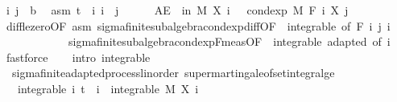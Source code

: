 \begin{isabellebody}
\ i\ j\ {\isacharcolon}{\kern0pt}{\isacharcolon}{\kern0pt}\ {\isacharprime}{\kern0pt}b\ \isamarkupfalse%
\ asm{\isacharcolon}{\kern0pt}\ {\isachardoublequoteopen}t\ {\isasymle}\ i{\isachardoublequoteclose}\ {\isachardoublequoteopen}i\ {\isasymle}\ j{\isachardoublequoteclose}\isanewline
\ \ \ \ \isamarkupfalse%
\ {\isachardoublequoteopen}AE\ {\isasymxi}\ in\ M{\isachardot}{\kern0pt}\ X\ i\ {\isasymxi}\ {\isasymge}\ cond{\isacharunderscore}{\kern0pt}exp\ M\ {\isacharparenleft}{\kern0pt}F\ i{\isacharparenright}{\kern0pt}\ {\isacharparenleft}{\kern0pt}X\ j{\isacharparenright}{\kern0pt}\ {\isasymxi}{\isachardoublequoteclose}\ \isanewline
\ \ \ \ \ \ \isamarkupfalse%
\ diff{\isacharunderscore}{\kern0pt}le{\isacharunderscore}{\kern0pt}zero{\isacharbrackleft}{\kern0pt}OF\ asm{\isacharbrackright}{\kern0pt}\ sigma{\isacharunderscore}{\kern0pt}finite{\isacharunderscore}{\kern0pt}subalgebra{\isachardot}{\kern0pt}cond{\isacharunderscore}{\kern0pt}exp{\isacharunderscore}{\kern0pt}diff{\isacharbrackleft}{\kern0pt}OF\ {\isacharunderscore}{\kern0pt}\ integrable{\isacharparenleft}{\kern0pt}{}{\isacharcomma}{\kern0pt}{}{\isacharparenright}{\kern0pt}{\isacharcomma}{\kern0pt}\ of\ {\isachardoublequoteopen}F\ i{\isachardoublequoteclose}\ j\ i{\isacharbrackright}{\kern0pt}\ \isanewline
\ \ \ \ \ \ \ \ \ \ \ \ sigma{\isacharunderscore}{\kern0pt}finite{\isacharunderscore}{\kern0pt}subalgebra{\isachardot}{\kern0pt}cond{\isacharunderscore}{\kern0pt}exp{\isacharunderscore}{\kern0pt}F{\isacharunderscore}{\kern0pt}meas{\isacharbrackleft}{\kern0pt}OF\ {\isacharunderscore}{\kern0pt}\ integrable\ adapted{\isacharcomma}{\kern0pt}\ of\ i{\isacharbrackright}{\kern0pt}\ \isamarkupfalse%
\ fastforce\isanewline
\ \ \isacommand{{\isacharbraceright}{\kern0pt}}\isamarkupfalse%
\isanewline
{}\isamarkupfalse%
\ {\isacharparenleft}{\kern0pt}intro\ integrable{\isacharparenright}{\kern0pt}%
\endisatagproof
{\isafoldproof}%
%
\isadelimproof
\isanewline
%
\endisadelimproof
\isanewline
{}\isamarkupfalse%
\ {\isacharparenleft}{\kern0pt}\ sigma{\isacharunderscore}{\kern0pt}finite{\isacharunderscore}{\kern0pt}adapted{\isacharunderscore}{\kern0pt}process{\isacharunderscore}{\kern0pt}linorder{\isacharparenright}{\kern0pt}\ supermartingale{\isacharunderscore}{\kern0pt}of{\isacharunderscore}{\kern0pt}set{\isacharunderscore}{\kern0pt}integral{\isacharunderscore}{\kern0pt}ge{\isacharcolon}{\kern0pt}\isanewline
\ \ \ integrable{\isacharcolon}{\kern0pt}\ {\isachardoublequoteopen}{\isasymAnd}i{\isachardot}{\kern0pt}\ t\ {\isasymle}\ i\ {\isasymLongrightarrow}\ integrable\ M\ {\isacharparenleft}{\kern0pt}X\ i{\isacharparenright}{\kern0pt}{\isachardoublequoteclose}\ \isanewline

\end{isabellebody}
